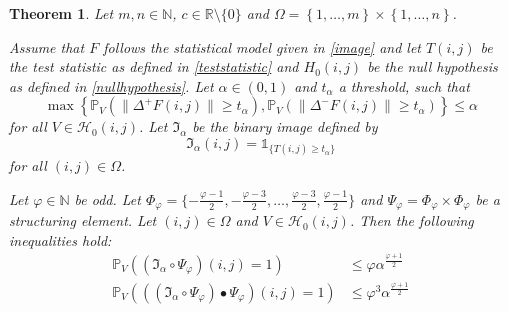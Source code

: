 \documentclass[a4paper,12pt]{article}
\newcommand{\norm}[1]{\lVert#1\rVert}
\theoremstyle{plain}
\newtheorem{theorem}{Theorem}[section]
\theoremstyle{definition}
\begin{document}
\begin{theorem}
	Let $m, n \in \mathbb{N}$, $c \in \mathbb{R} \setminus \{ 0 \}$ and $\Omega = \left\{ 1, \dots, m \right\} \times \left\{ 1, \dots, n \right\}$.
	
	Assume that $F$ follows the statistical model given in \eqref{image} and let $T(i, j)$ be the test statistic as defined in \eqref{teststatistic} and $H_0(i, j)$ be the null hypothesis as defined in \eqref{nullhypothesis}. Let $\alpha \in (0, 1)$ and $t_\alpha$ a threshold, such that
	\begin{equation*}
		\max \left\{ \mathbb{P}_V\left( \norm{\Delta^+ F(i, j)} \geq t_\alpha \right), \mathbb{P}_V\left( \norm{\Delta^- F(i, j)} \geq t_\alpha \right) \right\} \leq \alpha
	\end{equation*}
	for all $V \in \mathcal{H}_0(i, j)$. Let $\mathfrak{I}_\alpha$ be the binary image defined by
	\begin{equation}
		\mathfrak{I}_\alpha(i, j) = \mathds{1}_{ \{ T(i, j) \geq t_\alpha \} }
	\end{equation}
	for all $(i, j) \in \Omega$.
	
	Let $\varphi \in \mathbb{N}$ be odd. Let $\Phi_\varphi = \{ -\frac{\varphi - 1}{2}, -\frac{\varphi - 3}{2}, \dots, \frac{\varphi - 3}{2}, \frac{\varphi - 1}{2} \}$ and $\Psi_\varphi = \Phi_\varphi \times \Phi_\varphi$ be a structuring element. Let $(i, j) \in \Omega$ and $V \in \mathcal{H}_0(i, j)$.
	Then the following inequalities hold:
	\begin{align}
		\mathbb{P}_V( (\mathfrak{I}_\alpha \circ \Psi_\varphi)(i, j) = 1 ) &\leq \varphi \alpha^{\frac{\varphi + 1}{2}} \label{ineqtypeIopening} \\
		\mathbb{P}_V( ((\mathfrak{I}_\alpha \circ \Psi_\varphi) \bullet \Psi_\varphi)(i, j) = 1 ) &\leq \varphi^3 \alpha^{\frac{\varphi + 1}{2}} \label{ineqtypeIclosing}
	\end{align}
\end{theorem}
\end{document}
